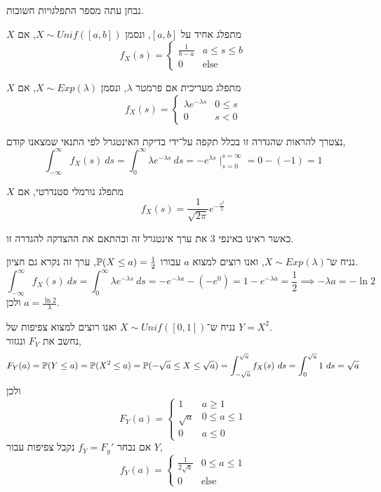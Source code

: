 נבחן עתה מספר התפלגויות חשובות.
\begin{definition}
	$X$ מתפלג אחיד על $[a, b]$, ונסמן $X \sim Unif([a, b])$, אם
	\[
		f_X(s) = \begin{cases}
			\frac{1}{b - a} & a \le s \le b \\
			0 & \text{else}
		\end{cases}
	\]
\end{definition}
\begin{definition}
	$X$ מתפלג מעריכית אם פרמטר $\lambda$, ונסמן $X \sim Exp(\lambda)$, אם
	\[
		f_X(s) = \begin{cases}
			\lambda e^{-\lambda s} & 0 \le s \\
			0 & s < 0
		\end{cases}
	\]
\end{definition}
נצטרך להראות שהגדרה זו בכלל תקפה על־ידי בדיקת האינטגרל לפי התנאי שמצאנו קודם,
\[
	\int_{-\infty}^\infty f_X(s)\ ds
	= \int_0^\infty \lambda e^{-\lambda s}\ ds
	= -e^{\lambda s} \mid_{s = 0}^{s = \infty}
	= 0 - (-1)
	= 1
\]
\begin{definition}
	$X$ מתפלג נורמלי סטנדרטי, אם
	\[
		f_X(s) = \frac{1}{\sqrt{2 \pi}} e^{-\frac{s^2}{2}}
	\]
\end{definition}
כאשר ראינו באינפי 3 את ערך אינטגרל זה ובהתאם את ההצדקה להגדרה זו.
\begin{example}
	נניח ש־$X \sim Exp(\lambda)$, ואנו רוצים למצוא $a$ עבורו $\mathbb{P}(X \le a) = \frac{1}{2}$, ערך זה נקרא גם חציון.
	\[
		\int_{-\infty}^{\infty} f_X(s)\ ds
		= \int_{0}^{\infty} \lambda e^{-\lambda s}\ ds
		= -e^{-\lambda a} - (-e^0)
		= 1 - e^{-\lambda a}
		= \frac{1}{2}
		\implies -\lambda a = - \ln 2
	\]
	ולכן $a = \frac{\ln 2}{\lambda}$.
\end{example}
\begin{example}
	נניח ש־$X \sim Unif([0, 1])$ ואנו רוצים למצוא צפיפות של $Y = X^2$. \\
	נחשב את $F_Y$ ונגזור,
	\[
		F_Y(a)
		= \mathbb{P}(Y \le a)
		= \mathbb{P}(X^2 \le a)
		= \mathbb{P}(-\sqrt{a} \le X \le \sqrt{a})
		= \int_{-\sqrt{a}}^{\sqrt{a}} f_X(s)\ ds
		= \int_0^{\sqrt{a}} 1\ ds
		= \sqrt{a}
	\]
	ולכן
	\[
		F_Y(a) = \begin{cases}
			1 & a \ge 1 \\
			\sqrt{a} & 0 \le a \le 1 \\
			0 & a \le 0
		\end{cases}
	\]
	אם נבחר $f_Y = F_y'$ נקבל צפיפות עבור $Y$,
	\[
		f_Y(a)
		= \begin{cases}
			\frac{1}{2 \sqrt{a}} & 0 \le a \le 1 \\
			0 & \text{else}
		\end{cases}
	\]
\end{example}

